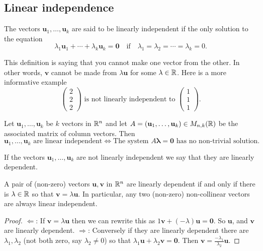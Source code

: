 \documentclass[10pt, a4paper]{article}
\newcommand{\mbf}[1]{\mathbf{#1}}
\begin{document}
\subsection{Linear independence}

\begin{definition}
    The vectors $\mbf{u}_1, \dotsc, \mbf{u}_k$ are said to be linearly independent if the only solution to the equation
    \[
    \lambda_1\mbf{u}_1 + \dotsi + \lambda_k\mbf{u}_k = \mbf{0}\quad\text{if}\quad\lambda_1 = \lambda_2 = \dotsi = \lambda_k = 0.
    \]
\end{definition}
This definition is saying that you cannot make one vector from the other.
In other words,
$\mbf{v}$ cannot be made from $\lambda\mbf{u}$ for some $\lambda \in \mathbb{R}$.
Here is a more informative example
\[
\begin{pmatrix}
    2 \\ 2 \\ 2
\end{pmatrix}\text{ is not linearly independent to }
\begin{pmatrix}
    1 \\ 1 \\ 1
\end{pmatrix}.
\]


\begin{corollary}
    Let $\mbf{u}_1, \dotsc, \mbf{u}_k$ be $k$ vectors in $\mathbb{R} ^ n$ and let $A = (\mbf{u}_1, \dotsc, \mbf{u}_k) \in M_{n, k}(\R)$ be the associated matrix of column vectors.
    Then
    \[
    \mbf{u}_1, \dotsc, \mbf{u}_k\text{ are linear independent} \iff \text{The system } A\mbf{\lambda} = \mbf{0}\text{ has no non-trivial solution}.
    \]
\end{corollary}
If the vectors $\mbf{u}_1, \dotsc, \mbf{u}_k$ are not linearly independent we say that they are linearly dependent.

\begin{lemma}
    A pair of (non-zero) vectors $\mbf{u}, \mbf{v}$ in $\mathbb{R} ^ n$ are linearly dependent if and only if there is $\lambda \in \mathbb{R}$ so that $\mbf{v} = \lambda\mbf{u}$.
    In particular,
    any two (non-zero) non-collinear vectors are always linear independent.
    \begin{proof}
        $\Leftarrow$:
        If $\mbf{v} = \lambda\mbf{u}$ then we can rewrite this as $1\mbf{v} + (-\lambda)\mbf{u} = \mbf{0}$.
        So $\mbf{u}$,
        and $\mbf{v}$ are linearly dependent.
        $\Rightarrow$:
        Conversely if they are linearly dependent there are $\lambda_1, \lambda_2$ (not both zero, say $\lambda_2 \neq 0$) so that $\lambda_1\mbf{u} + \lambda_2\mbf{v} = \mbf{0}$.
        Then
        $\mbf{v} = \frac{-\lambda_1}{\lambda_2}\mbf{u}$.
    \end{proof}
\end{lemma}
\end{document}
